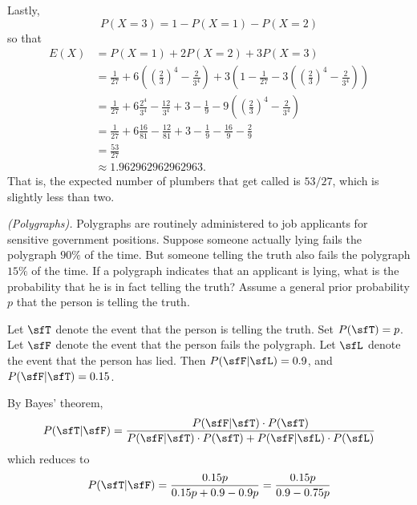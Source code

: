 \begin{solution}
  Lastly,
  \[
    P(X = 3) = 1-P(X = 1)-P(X = 2)
  \]
  so that
  \begin{align*}
    E(X) &= P(X=1) + 2P(X=2) + 3P(X = 3) \\
             &= \frac{1}{27} + 6\left(\left(\frac{2}{3}\right)^4 - \frac{2}{3^4} \right) + 3\left(1-\frac{1}{27} -  3\left(\left(\frac{2}{3}\right)^4 - \frac{2}{3^4} \right)\right) \\
             &= \frac{1}{27} + 6\frac{2^4}{3^4} - \frac{12}{3^4} + 3-\frac{1}{9} -  9\left(\left(\frac{2}{3}\right)^4 - \frac{2}{3^4} \right)\\
             &= \frac{1}{27} + 6\frac{16}{81} - \frac{12}{81} + 3-\frac{1}{9} -  \frac{16}{9} - \frac{2}{9}\\
             &= \frac{53}{27}\\
             &\approx\num{1.962962962962963}.
  \end{align*}
  That is, the expected number of plumbers that get called is $53/27$,
  which is slightly less than two.
\end{solution}
\newpage

\begin{problem}[Handout 4, \# 7]
  \emph{(Polygraphs).} Polygraphs are routinely administered to job
  applicants for sensitive government positions. Suppose someone actually
  lying fails the polygraph \(90\%\) of the time. But someone telling the
  truth also fails the polygraph \(15\%\) of the time. If a polygraph
  indicates that an applicant is lying, what is the probability that he is
  in fact telling the truth? Assume a general prior probability \(p\) that
  the person is telling the truth.
\end{problem}
\begin{solution}
  Let $\sfT$ denote the event that the person is telling the truth. Set
  $P(\sfT) = p$. Let $\sfF$ denote the event that the person fails the
  polygraph. Let $\sfL$ denote the event that the person has lied. Then
  $P(\sfF|\sfL) = 0.9$, and $P(\sfF|\sfT) = 0.15$.

  By Bayes' theorem,
  \[
    P(\sfT|\sfF) = \frac{P(\sfF|\sfT) \cdot P(\sfT)}{P(\sfF|\sfT)
      \cdot P(\sfT) + P(\sfF|\sfL) \cdot P(\sfL)}
  \]
  which reduces to
  \[
    P(\sfT|\sfF) = \frac{0.15p}{0.15p + 0.9 - 0.9p} = \frac{0.15p}{0.9 -
      0.75p}
  \]
\end{solution}
\newpage

